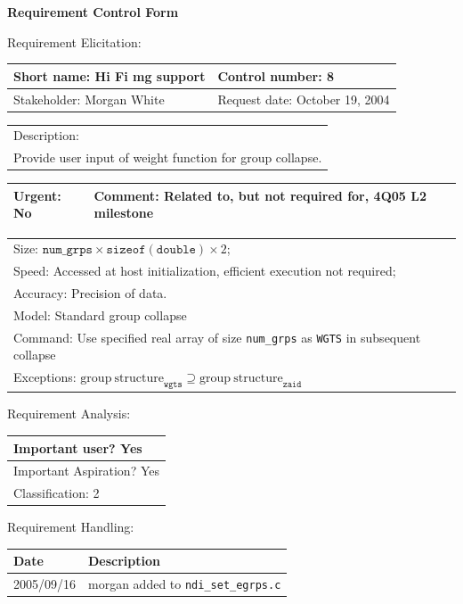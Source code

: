 \begin{center}\Large\bf
Requirement Control Form
\end{center}
\vspace{24pt}

Requirement Elicitation:

\begin{tabular}{|p{211pt}|p{211pt}|} \hline
Short name: Hi Fi mg support & Control number: 8\\ \hline
Stakeholder: Morgan White & Request date: October 19, 2004\\
\end{tabular}
\begin{tabular}{|p{433pt}|} \hline
Description: \\ 
Provide user input of weight function for group collapse. \\
\hline
\end{tabular} 
\begin{tabular}{|p{211pt}|p{211pt}|} \hline
Urgent: No & Comment: Related to, but not required for, 4Q05 L2 milestone \\ \hline
\end{tabular}

\vspace{12pt}

\begin{tabular}{|p{433pt}|} \hline
Size: $\mathtt{num\_grps} \times \mathtt{sizeof(double)} \times 2$; \\ 
Speed: Accessed at host initialization, efficient execution not required; \\
Accuracy: Precision of data. \\ \hline 
Model: Standard group collapse \\ \hline 
Command: Use specified real array of size \texttt{num\_grps} as
\texttt{WGTS} in subsequent collapse \\ \hline
Exceptions: $\mathrm{group\ structure}_\mathtt{wgts} \supseteq \mathrm{group\ structure}_\mathtt{zaid}$  \\ \hline
\end{tabular}
\vspace{24pt}

Requirement Analysis:

\begin{tabular}{|p{433pt}|} \hline
Important user? Yes \\ \hline
Important Aspiration? Yes \\ \hline
Classification: 2 \\ \hline
\end{tabular}
\vspace{24pt}

Requirement Handling:

\begin{tabular}{|p{72pt}|p{351pt}|} \hline
Date & Description \\ \hline
2005/09/16 & morgan added to \texttt{ndi\_set\_egrps.c} \\ \hline
\end{tabular}
